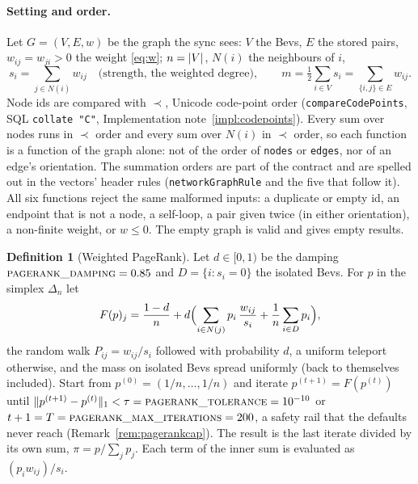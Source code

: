 \documentclass[11pt]{article}
\DeclarePairedDelimiter\abs{\lvert}{\rvert}
\newcommand{\code}[1]{\texttt{#1}}
\theoremstyle{plain}
\theoremstyle{definition}
\newtheorem{definition}[theorem]{Definition}
\theoremstyle{remark}
\begin{document}
\paragraph{Setting and order.} Let $G = (V, E, w)$ be the graph the sync sees: $V$ the Bevs, $E$ the stored pairs, $w_{ij} = w_{ji} > 0$ the weight \eqref{eq:w}; $n = \abs{V}$, $N(i)$ the neighbours of $i$,
\[
s_i = \sum_{j \in N(i)} w_{ij} \quad\text{(strength, the weighted degree)}, \qquad m = \tfrac12 \sum_{i \in V} s_i = \sum_{\{i,j\} \in E} w_{ij}.
\]
Node ids are compared with $\prec$, Unicode code-point order (\code{compareCodePoints}, SQL \code{collate "C"}, Implementation note~\ref{impl:codepoints}). Every sum over nodes runs in $\prec$ order and every sum over $N(i)$ in $\prec$ order, so each function is a function of the graph alone: not of the order of \code{nodes} or \code{edges}, nor of an edge's orientation. The summation orders are part of the contract and are spelled out in the vectors' header rules (\code{networkGraphRule} and the five that follow it). All six functions reject the same malformed inputs: a duplicate or empty id, an endpoint that is not a node, a self-loop, a pair given twice (in either orientation), a non-finite weight, or $w \le 0$. The empty graph is valid and gives empty results.

\begin{definition}[Weighted PageRank]\label{def:pagerank}
Let $d \in [0, 1)$ be the damping $\textsc{pagerank\_damping} = 0.85$ and $D = \{ i : s_i = 0 \}$ the isolated Bevs. For $p$ in the simplex $\Delta_n$ let
\begin{equation}\label{eq:pagerank}
F(p)_j = \frac{1 - d}{n} + d \Bigl( \sum_{i \in N(j)} p_i\, \frac{w_{ij}}{s_i} + \frac1n \sum_{i \in D} p_i \Bigr),
\end{equation}
the random walk $P_{ij} = w_{ij}/s_i$ followed with probability $d$, a uniform teleport otherwise, and the mass on isolated Bevs spread uniformly (back to themselves included). Start from $p^{(0)} = (1/n, \dots, 1/n)$ and iterate $p^{(t+1)} = F(p^{(t)})$ until $\lVert p^{(t+1)} - p^{(t)} \rVert_1 < \tau = \textsc{pagerank\_tolerance} = 10^{-10}$ or $t + 1 = T = \textsc{pagerank\_max\_iterations} = 200$, a safety rail that the defaults never reach (Remark~\ref{rem:pagerankcap}). The result is the last iterate divided by its own sum, $\pi = p / \sum_j p_j$. Each term of the inner sum is evaluated as $(p_i w_{ij}) / s_i$.
\end{definition}
\end{document}
